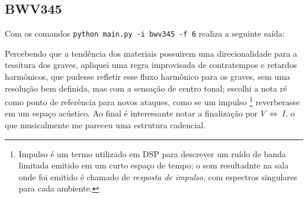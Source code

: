 \subsection{BWV345}

Com os comandos \verb|python main.py -i bwv345 -f 6| realiza a seguinte saída:



Percebendo que a tendência dos materiais possuirem uma direcionalidade para a tessitura dos graves, apliquei uma regra improvisada de contratempos e retardos harmônicos, que pudesse refletir esse fluxo harmônico para os graves, sem uma resolução bem definida, mas com a sensação de centro tonal; escolhi a nota ré como ponto de referência para novos ataques, como se um impulso \footnote{Impulso é um termo utilizado em DSP para descrever um ruído de banda limitada emitido em um curto espaço de tempo; o som resultadnte na sala onde foi emitido é chamado de \emph{resposta de impulso}, com espectros singulares para cada ambiente.} reverberasse em um espaço acústico. Ao final é interessante notar a finalização por $V~\Leftrightarrow~I$, o que musicalmente me pareceu uma estrutura cadencial.
 

